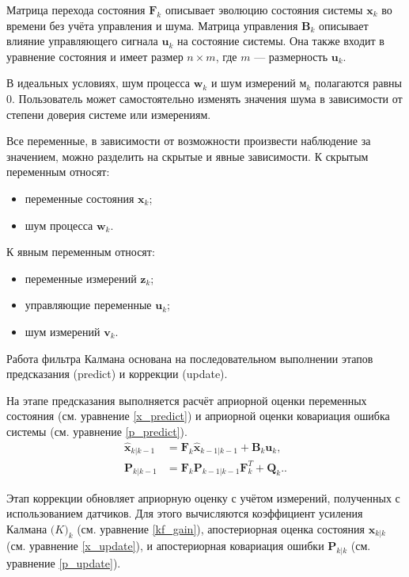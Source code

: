 Матрица перехода состояния \(\mathbf{F}_k\) описывает эволюцию состояния системы \(\mathbf{x}_k\) во времени без учёта управления и шума.
Матрица управления \(\mathbf{B}_k\) описывает влияние управляющего сигнала \(\mathbf{u}_k\) на состояние системы. Она также входит в уравнение состояния и имеет размер \(n \times m\), где \(m\) --- размерность \(\mathbf{u}_k\).

В идеальных условиях, шум процесса \(\mathbf{w}_k\) и шум измерений \(\mathbf{м}_k\)
полагаются равны 0. Пользователь может самостоятельно изменять 
значения шума в зависимости от степени доверия системе или измерениям.


Все переменные, в зависимости от возможности произвести наблюдение за значением,
можно разделить на скрытые и явные зависимости.
К скрытым переменным относят:
\begin{itemize}
    \item переменные состояния $\mathbf{x}_k$; 
    \item шум процесса $\mathbf{w}_k$.
\end{itemize}

К явным переменным относят:
\begin{itemize}
    \item переменные измерений $\mathbf{z}_k$; 
    \item управляющие переменные $\mathbf{u}_k$; 
    \item шум измерений $\mathbf{v}_k$.
\end{itemize}

Работа фильтра Калмана основана на последовательном выполнении этапов предсказания (predict) и 
коррекции (update).

На этапе предсказания выполняется расчёт 
априорной оценки переменных состояния (см. уравнение \ref{x_predict})
и априорной оценки ковариация ошибка системы (см. уравнение \ref{p_predict}).
\begin{align}
\hat{\mathbf{x}}_{k|k-1} &= \mathbf{F}_k \hat{\mathbf{x}}_{k-1|k-1} + \mathbf{B}_k \mathbf{u}_k, \label{x_predict}\\
\mathbf{P}_{k|k-1} &= \mathbf{F}_k \mathbf{P}_{k-1|k-1} \mathbf{F}_k^T + \mathbf{Q}_k. \label{p_predict}.
\end{align}

Этап коррекции обновляет априорную оценку с учётом измерений, полученных с использованием датчиков.
Для этого вычисляются коэффициент усиления Калмана \(\mathbf(K)_k\) (см. уравнение \ref{kf_gain}),
апостериорная оценка состояния \(\mathbf{x}_{k|k}\) (см. уравнение \ref{x_update}),
и апостериорная ковариация ошибки \(\mathbf{P}_{k|k}\) (см. уравнение \ref{p_update}).

